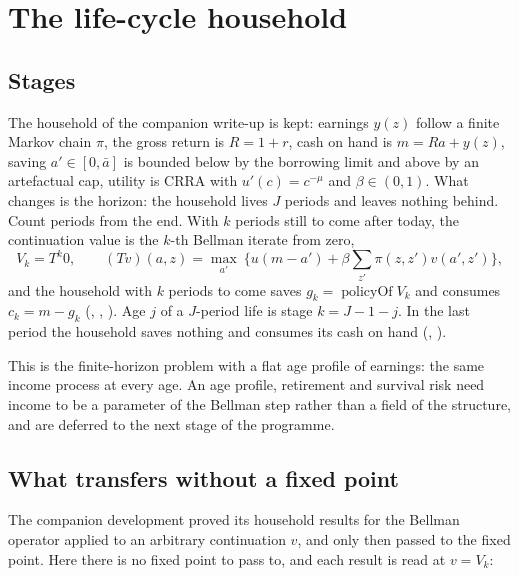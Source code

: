 \section{The life-cycle household}\label{sec:lc}

\subsection{Stages}

The household of the companion write-up is kept: earnings $y(z)$ follow a finite Markov chain
$\pi$, the gross return is $R=1+r$, cash on hand is $m=Ra+y(z)$, saving $a'\in[0,\bar a]$ is
bounded below by the borrowing limit and above by an artefactual cap, utility is CRRA with
$u'(c)=c^{-\mu}$ and $\beta\in(0,1)$. What changes is the horizon: the household lives $J$
periods and leaves nothing behind. Count periods from the end. With $k$ periods still to come
after today, the continuation value is the $k$-th Bellman iterate from zero,
\[
  V_k=T^k 0,\qquad (Tv)(a,z)=\max_{a'}\ \bigl\{u(m-a')+\beta\textstyle\sum_{z'}\pi(z,z')v(a',z')\bigr\},
\]
and the household with $k$ periods to come saves $g_k=\operatorname{policyOf}V_k$ and consumes
$c_k=m-g_k$ (, , ). Age $j$ of a
$J$-period life is stage $k=J-1-j$. In the last period the household saves nothing and consumes
its cash on hand (, ).

This is the finite-horizon problem with a flat age profile of earnings: the same income process at
every age. An age profile, retirement and survival risk need income to be a parameter of the
Bellman step rather than a field of the structure, and are deferred to the next stage of the
programme.

\subsection{What transfers without a fixed point}

The companion development proved its household results for the Bellman operator applied to an
arbitrary continuation $v$, and only then passed to the fixed point. Here there is no fixed point
to pass to, and each result is read at $v=V_k$:

